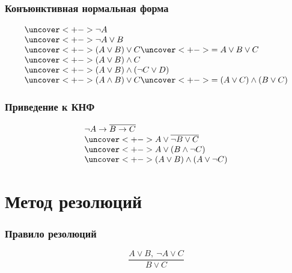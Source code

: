 \documentclass[24pt,pdf,hyperref={unicode}]{beamer}
\begin{document}
\begin{frame}\frametitle{Конъюнктивная нормальная форма}
$$
\begin{array}{l}
\uncover<+->{ \neg A } \\
\uncover<+->{ \neg A \vee B } \\
\uncover<+->{ (A \vee B) \vee C } \uncover<+->{ = A\vee B\vee C }\\
\uncover<+->{ (A\vee B)\wedge C } \\
\uncover<+->{ (A\vee B)\wedge (\neg C\vee D) } \\
\uncover<+->{ (A \wedge B) \vee C } \uncover<+->{ = (A\vee C)\wedge (B\vee C)}\\
\end{array}
$$
\end{frame}

\begin{frame}\frametitle{Приведение к КНФ}
$$
\begin{array}{l}
\neg A\rightarrow \overline{B\rightarrow C} \\
\uncover<+->{ A \vee \overline{\neg B \vee C }} \\
\uncover<+->{ A \vee (B \wedge \neg C) } \\
\uncover<+->{ (A\vee B) \wedge (A \vee \neg C) }
\end{array}
$$
\end{frame}

\section{Метод резолюций}

\begin{frame}\frametitle{Правило резолюций}
{\huge
$$
\frac{A\vee B,\ \neg A \vee C}{B \vee C}
$$
}
\end{frame}
\end{document}
